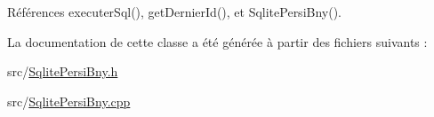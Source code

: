 Références executer\+Sql(), get\+Dernier\+Id(), et Sqlite\+Persi\+Bny().



La documentation de cette classe a été générée à partir des fichiers suivants \+:\begin{DoxyCompactItemize}
\item 
src/\hyperlink{SqlitePersiBny_8h}{Sqlite\+Persi\+Bny.\+h}\item 
src/\hyperlink{SqlitePersiBny_8cpp}{Sqlite\+Persi\+Bny.\+cpp}\end{DoxyCompactItemize}
